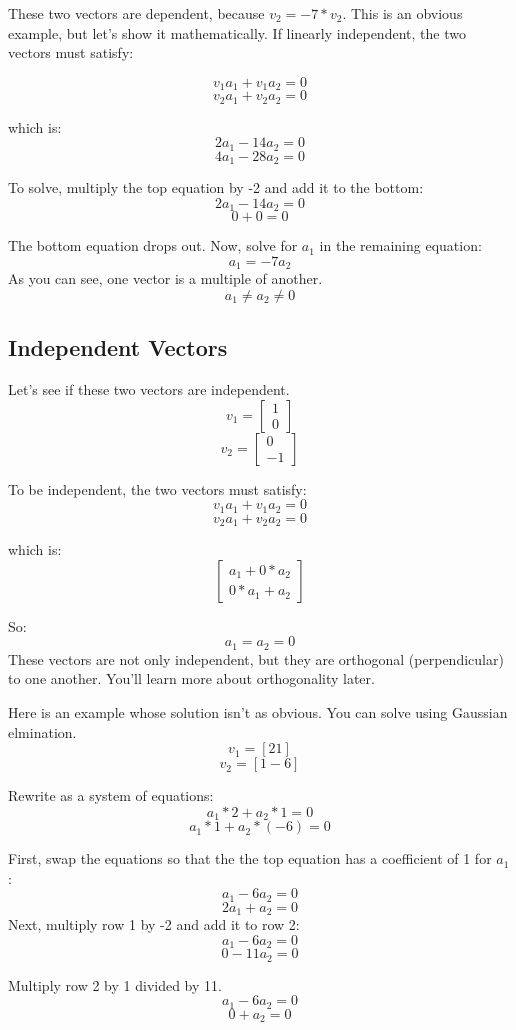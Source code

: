 These two vectors are dependent, because $v_2 = -7*v_2$. This is an obvious example, but let's show it mathematically. If linearly independent, the two vectors must satisfy:

	$$v_1a_1 + v_1a_2 = 0$$
	$$v_2a_1 + v_2a_2 = 0$$

which is:
	$$2a_1 -14a_2 = 0$$
	$$4a_1 -28a_2 = 0$$

To solve, multiply the top equation by -2 and add it to the bottom: 
$$2a_1 - 14a_2 = 0 $$
$$ 0  + 0     = 0 $$

The bottom equation drops out. Now,  solve for $a_1$ in the remaining equation:
$$a_1 = -7a_2$$
As you can see, one vector is a multiple of another. $$a_1 \neq a_2 \neq 0$$

\subsection{Independent Vectors}
Let's see if these two vectors are independent.
$$v_1 = \begin{bmatrix}
1 \\
0
\end{bmatrix}$$
$$v_2 = \begin{bmatrix}
0 \\
-1
\end{bmatrix}$$

To be independent, the two vectors must satisfy:
	$$v_1a_1 + v_1a_2 = 0$$
	$$v_2a_1 + v_2a_2 = 0$$
	
which is:
$$\begin{bmatrix}
	a_1 + 0*a_2 \\
	0*a_1 + a_2
\end{bmatrix}$$

So:
$$a_1 = a_2 = 0$$
These vectors are not only independent, but they are orthogonal (perpendicular) to one another. You'll learn more about orthogonality later.

Here is an example whose solution isn't as obvious. You can solve using Gaussian elmination.
$$v_1 = [2 1]$$
$$v_2 = [1 -6]$$

Rewrite as a system of equations:
$$a_1*2 + a_2*1 = 0 $$
$$a_1*1 + a_2*(-6) = 0$$

First, swap the equations so that the the top equation has a coefficient of 1 for $a_1$:
$$a_1 - 6a_2 = 0$$ 
$$2a_1 + a_2 = 0$$ 
Next, multiply row 1 by -2 and add it to row 2:
$$a_1 - 6a_2 = 0$$ 
$$0  - 11a_2 = 0$$ 

Multiply row 2 by 1 divided by 11.
$$a_1 - 6a_2 = 0$$ 
$$0 + a_2 = 0$$ 

